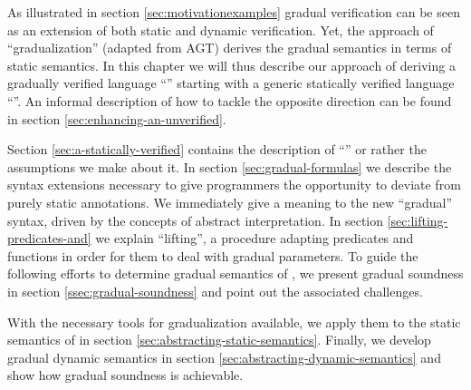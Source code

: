 As illustrated in section \ref{sec:motivationexamples} gradual verification can be seen as an extension of both static and dynamic verification.
Yet, the approach of “gradualization” (adapted from AGT) derives the gradual semantics in terms of static semantics.
In this chapter we will thus describe our approach of deriving a gradually verified language “{\gvl}” starting with a generic statically verified language “{\svl}”.
An informal description of how to tackle the opposite direction can be found in section \ref{sec:enhancing-an-unverified}.

Section \ref{sec:a-statically-verified} contains the description of “{\svl}” or rather the assumptions we make about it.
In section \ref{sec:gradual-formulas} we describe the syntax extensions necessary to give programmers the opportunity to deviate from purely static annotations.
We immediately give a meaning to the new “gradual” syntax, driven by the concepts of abstract interpretation.
In section \ref{sec:lifting-predicates-and} we explain “lifting”, a procedure adapting predicates and functions in order for them to deal with gradual parameters.
To guide the following efforts to determine gradual semantics of \gvl, we present gradual soundness in section \ref{ssec:gradual-soundness} and point out the associated challenges.

With the necessary tools for gradualization available, we apply them to the static semantics of \svl in section \ref{sec:abstracting-static-semantics}.
Finally, we develop gradual dynamic semantics in section \ref{sec:abstracting-dynamic-semantics} and show how gradual soundness is achievable.

